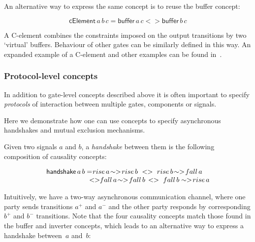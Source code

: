 \documentclass[british,conference,compsoc]{IEEEtran}
\begin{document}
\vspace{-1mm}

An alternative way to express the same concept is to reuse the buffer concept:

\vspace{-3mm}

\[
\mathsf{cElement}\,a\, b\, c=\mathsf{buffer}\,a\, c <> \mathsf{buffer}\,b\, c
\]

\vspace{-1mm}

A C-element combines the constraints imposed on the output
transitions by two `virtual' buffers. Behaviour of other gates can be similarly
defined in this way. An expanded example of a C-element and other examples can 
be found in~\cite{2015_Beaumont_MEMOCODE}.

\vspace{-2mm}

\subsubsection{Protocol-level concepts} In addition to gate-level concepts
described above it is often important to specify \emph{protocols}
of interaction between multiple gates, components or signals. 

Here we demonstrate how one can use concepts to specify asynchronous handshakes
and mutual exclusion mechanisms.

Given two signals $a$ and $b$, a \emph{handshake} between them is
the following composition of causality concepts:

\[
\begin{array}{lcl}
\mathsf{handshake}\,a\, b=&\hspace{-7mm}rise\,a\!\sim>\! rise\,b\ 
	<>\ rise\,b\!\sim>\! fall\,a \\
&\hspace{-5mm}<>\hspace{-1mm} fall\,a\!\sim>\! fall\,b \, 
	<>\ fall\,b \sim>\! rise\,a
\end{array}
\]

Intuitively, we have a two-way asynchronous communication channel,
where one party sends transitions $a^{+}$ and $a^{-}$ and the other
party responds by corresponding $b^{+}$ and $b^{-}$ transitions.
Note that the four causality concepts match those found
in the buffer and inverter concepts, which leads to an alternative
way to express a handshake between~$a$ and~$b$:

\vspace{-3mm}
\end{document}
